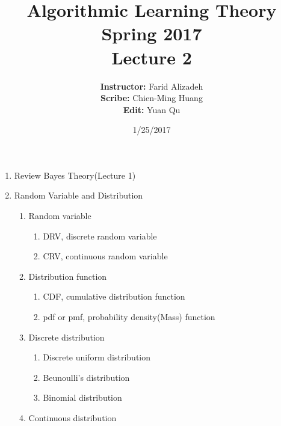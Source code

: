 \documentclass{article}
\title{ 
    Algorithmic Learning Theory\\
    Spring 2017\\
    Lecture 2 %
}
\author{
    {\bf Instructor: } Farid Alizadeh\\
    {\bf Scribe: } Chien-Ming Huang\\
    {\bf Edit: } Yuan Qu\\
}
\date{1/25/2017} %
\begin{document}
\pagestyle{fancy}

\maketitle
%


\medskip
\begin{enumerate}
    \item Review Bayes Theory(Lecture 1) 
    \item Random Variable and Distribution
        \begin{enumerate}
            \item Random variable
                \begin{enumerate}
                    \item DRV, discrete random variable
                    \item CRV, continuous random variable
                \end{enumerate}
            \item Distribution function
                \begin{enumerate}
                    \item CDF, cumulative distribution function
                    \item pdf or pmf, probability density(Mass) function
                \end{enumerate}
            \item Discrete distribution
                \begin{enumerate}
                    \item Discrete uniform distribution
                    \item Beunoulli's distribution
                    \item Binomial distribution
                \end{enumerate}
            \item Continuous distribution
                \begin{enumerate}

\end{enumerate}
\end{enumerate}
\end{enumerate}
\end{document}
